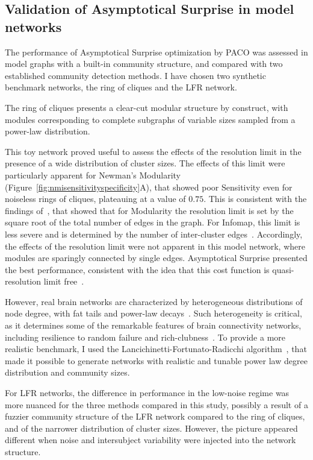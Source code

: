 \subsection{Validation of Asymptotical Surprise in model networks}
The performance of Asymptotical Surprise optimization by PACO was assessed in model graphs with a built-in community structure, and compared with two established community detection methods.
I have chosen two synthetic benchmark networks, the ring of cliques and the LFR network.

The ring of cliques presents a clear-cut modular structure by construct, with modules corresponding to complete subgraphs of variable sizes sampled from a power-law distribution.

This toy network proved useful to assess the effects of the resolution limit in the presence of a wide distribution of cluster sizes.
The effects of this limit were particularly apparent for Newman's Modularity (Figure~\ref{fig:nmisensitivityspecificity}A), that showed poor Sensitivity even for noiseless rings of cliques, plateauing at a value of $0.75$.
This is consistent with the findings of~\cite{fortunato2007}, that showed that for Modularity the resolution limit is set by the square root of the total number of edges in the graph.
For Infomap, this limit is less severe and is determined by the number of inter-cluster edges~\cite{kawamoto2015}.
Accordingly, the effects of the resolution limit were not apparent in this model network, where modules are sparingly connected by single edges.
Asymptotical Surprise presented the best performance, consistent with the idea that this cost function is quasi-resolution limit free~\cite{traag2015}.

However, real brain networks are characterized by heterogeneous distributions of node degree, with fat tails and power-law decays~\cite{bullmore2009}.
Such heterogeneity is critical, as it determines some of the remarkable features of brain connectivity networks, including resilience to random failure and rich-clubness~\cite{vandenheuvel2011,vandenheuvel2013a}.
To provide a more realistic benchmark, I used the Lancichinetti-Fortunato-Radicchi algorithm~\cite{lancichinetti2008}, that made it possible to generate networks with realistic and tunable power law degree distribution and community sizes.

For LFR networks, the difference in performance in the low-noise regime was more nuanced for the three methods compared in this study, possibly a result of a fuzzier community structure of the LFR network compared to the ring of cliques, and of the narrower distribution of cluster sizes.
However, the picture appeared different when noise and intersubject variability were injected into the network structure.

